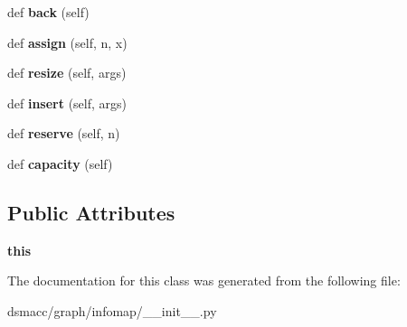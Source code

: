 \begin{DoxyCompactItemize}
def {\bfseries back} (self)
\item 
\mbox{\label{classdsmacc_1_1graph_1_1infomap_1_1StringVector_a9d8239aff343bc0b418d0f17a4d8a7c2}} 
def {\bfseries assign} (self, n, x)
\item 
\mbox{\label{classdsmacc_1_1graph_1_1infomap_1_1StringVector_a0cb209336c1ce46fa407d1fffca6d229}} 
def {\bfseries resize} (self, args)
\item 
\mbox{\label{classdsmacc_1_1graph_1_1infomap_1_1StringVector_a344bbbb05573d15bfc25c04958618fb2}} 
def {\bfseries insert} (self, args)
\item 
\mbox{\label{classdsmacc_1_1graph_1_1infomap_1_1StringVector_a5c26ca4a0470cddcd8e084ded034029d}} 
def {\bfseries reserve} (self, n)
\item 
\mbox{\label{classdsmacc_1_1graph_1_1infomap_1_1StringVector_aaa242f55c34e91b98de4a5ff71a90c59}} 
def {\bfseries capacity} (self)
\end{DoxyCompactItemize}
\subsection*{Public Attributes}
\begin{DoxyCompactItemize}
\item 
\mbox{\label{classdsmacc_1_1graph_1_1infomap_1_1StringVector_a1c4a7b7f08b8d91da1010eee14333171}} 
{\bfseries this}
\end{DoxyCompactItemize}


The documentation for this class was generated from the following file\+:\begin{DoxyCompactItemize}
\item 
dsmacc/graph/infomap/\+\_\+\+\_\+init\+\_\+\+\_\+.\+py\end{DoxyCompactItemize}
